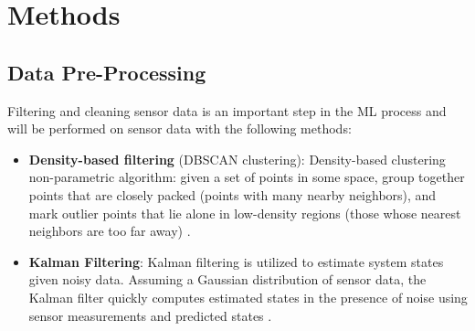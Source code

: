 \documentclass{article}
\begin{document}
\section{Methods} \label{sec:methods}
\subsection{Data Pre-Processing}
Filtering and cleaning sensor data is an important step in the ML process and will be performed on sensor data with the following methods:
\begin{itemize}

\item \textbf{Density-based filtering} (DBSCAN clustering): Density-based clustering non-parametric algorithm: given a set of points in some space, group together points that are closely packed (points with many nearby neighbors), and mark outlier points that lie alone in low-density regions (those whose nearest neighbors are too far away) \cite{scikit-learn-dbscan}.

\item \textbf{Kalman Filtering}: Kalman filtering is utilized to estimate system states given noisy data. Assuming a Gaussian distribution of sensor data, the Kalman filter quickly computes estimated states in the presence of noise using sensor measurements and predicted states \cite{KalmanFilter1D}.



\end{itemize}
\end{document}
